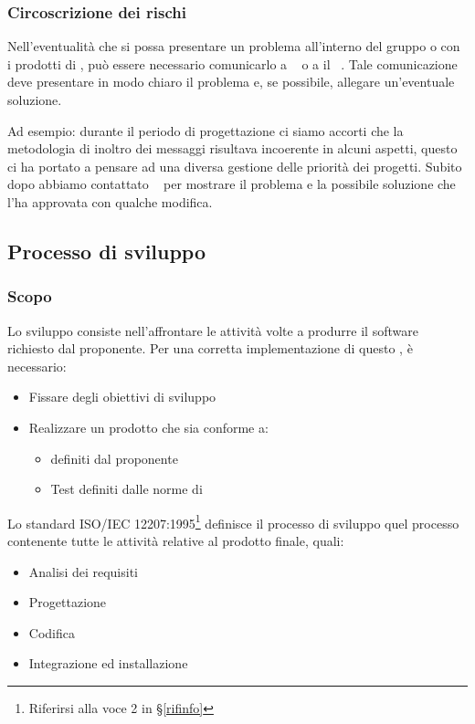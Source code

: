         \subsubsection{Circoscrizione dei rischi}
        Nell'eventualità che si possa presentare un problema all'interno del gruppo o con i prodotti di \progetto, può essere necessario comunicarlo a \DZ~ o a il \TV~. Tale comunicazione deve presentare in modo chiaro il problema e, se possibile, allegare un'eventuale soluzione. \par
        Ad esempio: durante il periodo di progettazione ci siamo accorti che la metodologia di inoltro dei messaggi risultava incoerente in alcuni aspetti, questo ci ha portato a pensare ad una diversa gestione delle priorità dei progetti. Subito dopo abbiamo contattato \DZ~ per mostrare il problema e la possibile soluzione che l'ha approvata con qualche modifica.


    \subsection{Processo di sviluppo}\label{PP:Sviluppo}

		\subsubsection{Scopo}\label{PP:Sviluppo:Scopo}
		Lo sviluppo consiste nell'affrontare le attività volte a produrre il software richiesto dal proponente.
		Per una corretta implementazione di questo , è necessario:
		\begin{itemize}
			\item Fissare degli obiettivi di sviluppo
			\item Realizzare un prodotto che sia conforme a:
			\begin{itemize}
				\item {} definiti dal proponente
				\item Test definiti dalle norme di 
			\end{itemize}
		\end{itemize}
		Lo standard ISO/IEC 12207:1995\footnote{Riferirsi alla voce
		2
		 in \S\ref{rifinfo}} definisce il processo di
		sviluppo quel processo contenente tutte le attività relative al prodotto finale, quali:
		\begin{itemize} %
			\item Analisi dei requisiti
			\item Progettazione
			\item Codifica
			\item Integrazione ed installazione
		\end{itemize}


